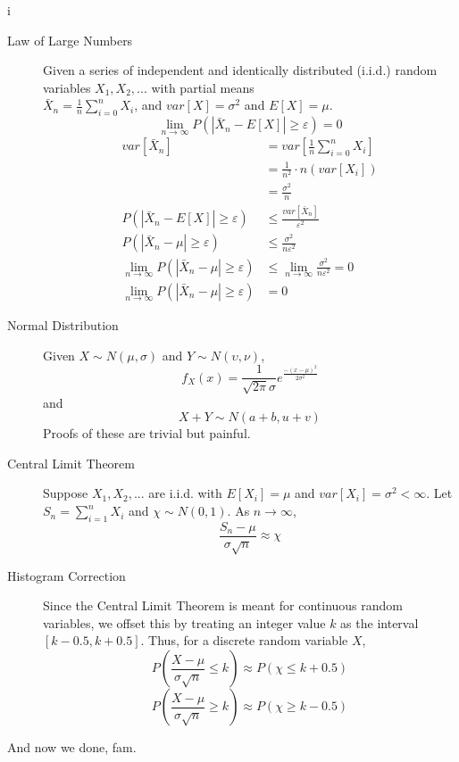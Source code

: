 i\documentclass[10pt]{article}
\begin{document}
\begin{description}
    \item[Law of Large Numbers] Given a series of independent and identically distributed (i.i.d.) random 
        variables $X_1,X_2,...$ with partial means \\ $\bar{X}_n = \frac{1}{n}\sum_{i=0}^n X_i$, and 
        $var[X] = \sigma ^2$ and $E[X] = \mu$. 
    \[ \lim_{n \rightarrow \infty} P(|\bar{X}_n - E[X]|\geq \varepsilon) = 0 \]
        \begin{align*}
            var[\bar{X}_n] &= var\left[\frac{1}{n}\sum_{i=0}^n X_i \right] \\
                           &= \frac{1}{n^2} \cdot n(var[X_i]) \\
                           &= \frac{\sigma ^2}{n} \\
            P(|\bar{X}_n - E[X]| \geq \varepsilon) &\leq \frac{var[\bar{X}_n]}{\varepsilon ^2} \\
            P(|\bar{X}_n - \mu| \geq \varepsilon) &\leq \frac{\sigma ^2}{n \varepsilon ^2} \\
            \lim_{n \rightarrow \infty} P(|\bar{X}_n - \mu| \geq \varepsilon) &\leq 
                \lim_{n \rightarrow \infty}\frac{\sigma ^2}{n \varepsilon ^2} = 0\\
            \lim_{n \rightarrow \infty} P(|\bar{X}_n - \mu| \geq \varepsilon) &= 0 
        \end{align*}
    \item[Normal Distribution] Given $X \sim N(\mu,\sigma)$ and $Y \sim N(\upsilon,\nu)$, 
        \[ f_X(x) = \frac{1}{\sqrt{2\pi}\sigma}e^{\frac{-(x-\mu)^2}{2\sigma^2}} \]
        and
        \[ X + Y \sim N(a + b, u + v) \] 
        Proofs of these are trivial but painful. 

    \item[Central Limit Theorem] Suppose $X_1, X_2, ...$ are i.i.d. with $E[X_i] = \mu$ and 
        $var[X_i] = \sigma ^2 < \infty$. Let $S_n = \sum_{i = 1}^n X_i$ and $\chi \sim N(0,1)$. 
        As $n \rightarrow \infty$,
        \[ \frac{S_n - \mu}{\sigma\sqrt{n}} \approx \chi \]
    \item[Histogram Correction] Since the Central Limit Theorem is meant for continuous random variables,
        we offset this by treating an integer value $k$ as the interval $[k - 0.5, k + 0.5]$. Thus, for
        a discrete random variable $X$, 
        \[P\left(\frac{X - \mu}{\sigma \sqrt{n}} \leq k\right) \approx P\left(\chi \leq k + 0.5\right) \]
        \[P\left(\frac{X - \mu}{\sigma \sqrt{n}} \geq k\right) \approx P\left(\chi \geq k - 0.5\right) \]
\end{description}
And now we done, fam.
\end{document}
